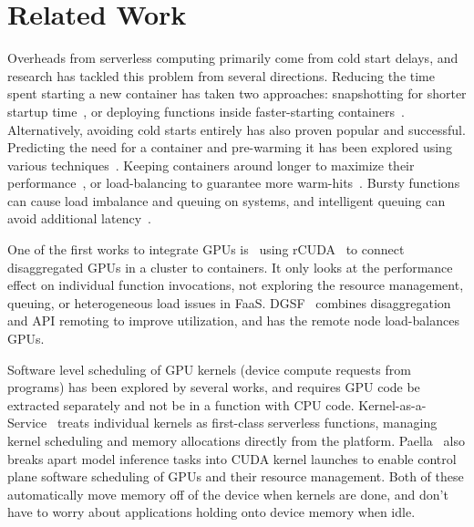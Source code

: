 \section{Related Work}
\label{sec:related}

Overheads from serverless computing primarily come from cold start delays, and research has tackled this problem from several directions.
Reducing the time spent starting a new container has taken two approaches: snapshotting for shorter startup time~\cite{du2020catalyzer,vhive-asplos21}, or deploying functions inside faster-starting containers~\cite{unikernels,firecracker-nsdi20,shillaker2020faasm}.
Alternatively, avoiding cold starts entirely has also proven popular and successful.
Predicting the need for a container and pre-warming it has been explored using various techniques~\cite{shahrad2020serverless,vahidinia2022mitigating,ebrahimi2024cold}.
Keeping containers around longer to maximize their performance~\cite{faascache-asplos21}, or load-balancing to guarantee more warm-hits~\cite{faaslb-hpdc22,balaji2021fireplace,abdi2023palette}.
Bursty functions can cause load imbalance and queuing on systems, and intelligent queuing can avoid additional latency~\cite{yan2020hermes}.

One of the first works to integrate GPUs is~\cite{naranjo2020accelerated} using rCUDA~\cite{duato2010rcuda} to connect disaggregated GPUs in a cluster to containers.
It only looks at the performance effect on individual function invocations, not exploring the resource management, queuing, or heterogeneous load issues in FaaS.
DGSF~\cite{fingler2022dgsf} combines disaggregation and API remoting to improve utilization, and has the remote node load-balances GPUs.

Software level scheduling of GPU kernels (device compute requests from programs) has been explored by several works, and requires GPU code be extracted separately and not be in a function with CPU code.
Kernel-as-a-Service~\cite{pemberton2022kernel} treats individual kernels as first-class serverless functions, managing kernel scheduling and memory allocations directly from the platform.
Paella~\cite{ng2023paella} also breaks apart model inference tasks into CUDA kernel launches to enable control plane software scheduling of GPUs and their resource management.
Both of these automatically move memory off of the device when kernels are done, and don't have to worry about applications holding onto device memory when idle.

